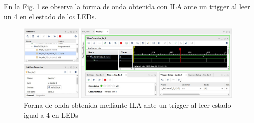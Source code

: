 \documentclass{article}
\begin{document}
En la Fig. \ref{fig:ila-waveform} se observa la forma de onda obtenida con ILA ante un trigger al leer un 4 en el estado de los LEDs.

\begin{figure}[ht]
    \centering
    \includegraphics[width=\textwidth]{ila_waveform.jpg}
    \caption{Forma de onda obtenida mediante ILA ante un trigger al leer estado igual a 4 en LEDs}
    \label{fig:ila-waveform}
\end{figure}
\end{document}
